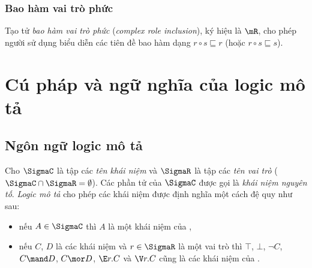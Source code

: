 \subsubsection{Bao hàm vai trò phức}
\label{sec:Chap1.RoleInclusion}
Tạo tử {\em bao hàm vai trò phức} ({\em complex role inclusion}), ký hiệu là $\mR$, cho phép người sử dụng biểu diễn các tiên đề bao hàm dạng $r \circ s \sqsubseteq r$ (hoặc $r \circ s \sqsubseteq s$).

\section{Cú pháp và ngữ nghĩa của logic mô tả}
\label{sec:Chap1.SyntaxSemantic}
\subsection{Ngôn ngữ logic mô tả \ALC}
\label{sec:Chap1.ALCLanguage}
\begin{Definition}
\label{def:ALCSyntax}
Cho $\SigmaC$ là tập các {\em tên khái niệm} và $\SigmaR$ là tập các {\em tên vai trò} ($\SigmaC \cap \SigmaR = \emptyset$). Các phần tử của $\SigmaC$ được gọi là {\em khái niệm nguyên tố}. {\em Logic mô tả} \ALC cho phép các khái niệm được định nghĩa một cách đệ quy như sau:
\begin{itemize}
	\item nếu $A \in \SigmaC$ thì $A$ là một khái niệm của \ALC,
	\item nếu $C$, $D$ là các khái niệm và $r \in \SigmaR$ là một vai trò thì $\top$, $\bot$, $\neg C$, $C \mand D$, $C \mor D$, $\E r.C$ và $\V r.C$ cũng là các khái niệm của \ALC.\myend
\end{itemize}
\end{Definition}

